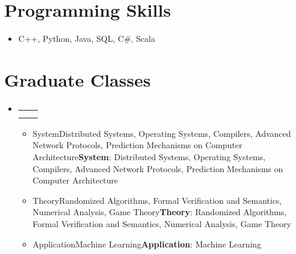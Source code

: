 \documentclass[letterpaper,10pt]{article}
\makeatletter
\def \ifempty#1{\def\temp{#1} \ifx\temp\empty }
\newcommand{\resumeItem}[2]{
  \item\small{
  	\ifempty{#1}#2\else\textbf{#1}{: #2 \vspace{-2pt}}\fi
  }
}
\newcommand{\resumeSubheading}[4]{
  \vspace{-1pt}\item
    \begin{tabular*}{0.97\textwidth}{l@{\extracolsep{\fill}}r}
      \textbf{#1} & #2 \\
      \textit{\small#3} & \textit{\small #4} \\
    \end{tabular*}\vspace{-5pt}
}
\newcommand{\resumeSubHeadingListStart}{\begin{itemize}[leftmargin=*]}
\newcommand{\resumeSubHeadingListEnd}{\end{itemize}}
\newcommand{\resumeItemListStart}{\begin{itemize}}
\newcommand{\resumeItemListEnd}{\end{itemize}\vspace{-5pt}}
\makeatother
\begin{document}
\section{Programming Skills}
 \resumeSubHeadingListStart
   \item{
     C++, Python, Java, SQL, C\#, Scala
   }
 \resumeSubHeadingListEnd

\section{Graduate Classes}
 \resumeSubHeadingListStart
    \resumeSubheading {}{}{}{}
      \resumeItemListStart
        \resumeItem{System}
        {Distributed Systems, Operating Systems, Compilers, Advanced Network
Protocols, Prediction Mechanisms on Computer Architecture}
        \resumeItem{Theory}
        {Randomized Algorithms, Formal Verification and Semantics, Numerical
Analysis, Game Theory}
        \resumeItem{Application}
        {Machine Learning}
      \resumeItemListEnd
 \resumeSubHeadingListEnd



\end{document}
